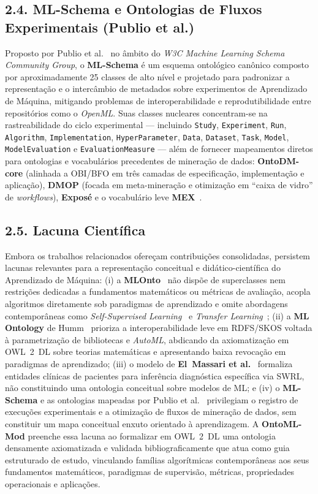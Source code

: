 \documentclass[11pt,a4paper]{article}
\newcommand{\onto}[1]{\texttt{\small #1}}
\begin{document}
\subsection{2.4. ML-Schema e Ontologias de Fluxos Experimentais (Publio et al.)}

Proposto por Publio et al.~\cite{publio2018mlschema} no âmbito do \emph{W3C Machine Learning Schema Community Group}, o \textbf{ML-Schema} é um esquema ontológico canônico composto por aproximadamente 25 classes de alto nível e projetado para padronizar a representação e o intercâmbio de metadados sobre experimentos de Aprendizado de Máquina, mitigando problemas de interoperabilidade e reprodutibilidade entre repositórios como o \emph{OpenML}. Suas classes nucleares concentram-se na rastreabilidade do ciclo experimental --- incluindo \onto{Study}, \onto{Experiment}, \onto{Run}, \onto{Algorithm}, \onto{Implementation}, \onto{HyperParameter}, \onto{Data}, \onto{Dataset}, \onto{Task}, \onto{Model}, \onto{ModelEvaluation} e \onto{EvaluationMeasure} --- além de fornecer mapeamentos diretos para ontologias e vocabulários precedentes de mineração de dados: \textbf{OntoDM-core} (alinhada a OBI/BFO em três camadas de especificação, implementação e aplicação), \textbf{DMOP} (focada em meta-mineração e otimização em ``caixa de vidro'' de \emph{workflows}), \textbf{Exposé} e o vocabulário leve \textbf{MEX}~\cite{publio2018mlschema}.

\subsection{2.5. Lacuna Científica}

Embora os trabalhos relacionados ofereçam contribuições consolidadas, persistem lacunas relevantes para a representação conceitual e didático-científica do Aprendizado de Máquina: (i) a \textbf{MLOnto}~\cite{braga2020mlonto} não dispõe de superclasses nem restrições dedicadas a fundamentos matemáticos ou métricas de avaliação, acopla algoritmos diretamente sob paradigmas de aprendizado e omite abordagens contemporâneas como \emph{Self-Supervised Learning}~\cite{liu2023self} e \emph{Transfer Learning}~\cite{zhuang2021transfer}; (ii) a \textbf{ML Ontology} de Humm~\cite{humm2026industry} prioriza a interoperabilidade leve em RDFS/SKOS voltada à parametrização de bibliotecas e \emph{AutoML}, abdicando da axiomatização em OWL~2~DL sobre teorias matemáticas e apresentando baixa revocação em paradigmas de aprendizado; (iii) o modelo de \textbf{El~Massari et al.}~\cite{elmassari2022diabetes} formaliza entidades clínicas de pacientes para inferência diagnóstica específica via SWRL, não constituindo uma ontologia conceitual sobre modelos de ML; e (iv) o \textbf{ML-Schema} e as ontologias mapeadas por Publio et al.~\cite{publio2018mlschema} privilegiam o registro de execuções experimentais e a otimização de fluxos de mineração de dados, sem constituir um mapa conceitual enxuto orientado à aprendizagem. A \textbf{OntoML-Mod} preenche essa lacuna ao formalizar em OWL~2~DL uma ontologia densamente axiomatizada e validada bibliograficamente que atua como guia estruturado de estudo, vinculando famílias algorítmicas contemporâneas aos seus fundamentos matemáticos, paradigmas de supervisão, métricas, propriedades operacionais e aplicações.
\end{document}
